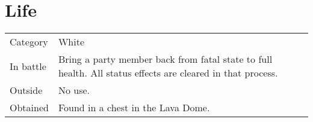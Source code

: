 \section{Life}
\label{spell:life}


\noindent\begin{tabularx}{\textwidth}[l]{lX}
	Category
	& White
\\ %
	In battle
	& Bring a party member back from fatal state to full health. All status effects are cleared in that process.
\\ %
	Outside
	& No use.
\\ %
	Obtained
	& Found in a chest in the Lava Dome.
\end{tabularx}
